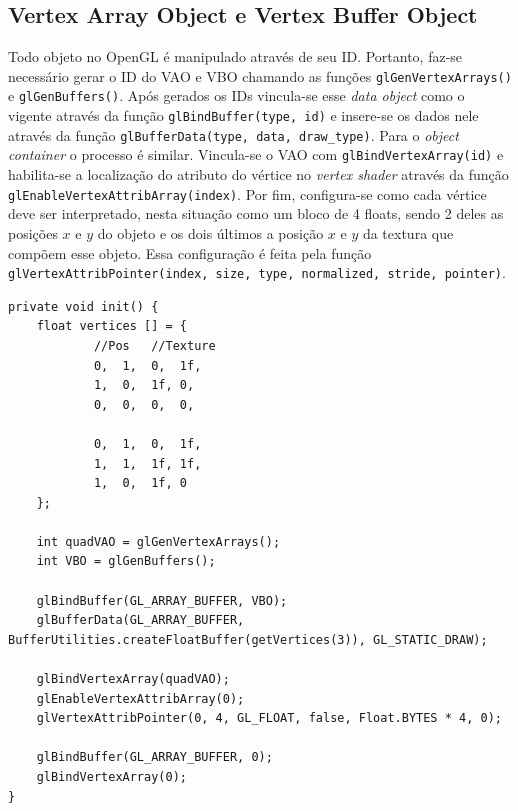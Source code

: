 \documentclass[12pt, 
openright, 
oneside, 
a4paper,    
brazil]{facom-ufu-abntex2}
\begin{document}
\subsection{Vertex Array Object e Vertex Buffer Object}
Todo objeto no OpenGL é manipulado através de seu ID. Portanto, faz-se necessário gerar o ID do VAO e VBO chamando as funções \texttt{glGenVertexArrays()} e \linebreak \texttt{glGenBuffers()}. Após gerados os IDs vincula-se esse \textit{data object} como o vigente através da função \texttt{glBindBuffer}\texttt{(type, id)} e insere-se os dados nele através da função \texttt{glBufferData(type, data, draw_type)}. Para o \textit{object container} o processo é similar. Vincula-se o VAO com \texttt{glBindVertexArray(id)} e habilita-se a localização do atributo do vértice no \textit{vertex shader} através da função \texttt{glEnableVertexAttribArray(index)}. Por fim, configura-se como cada vértice deve ser interpretado, nesta situação como um bloco de 4 floats, sendo 2 deles as posições $x$ e $y$ do objeto e os dois últimos a posição $x$ e $y$ da textura que compõem esse objeto. Essa configuração é feita pela função \texttt{glVertexAttribPointer(index, size, type, normalized, stride, pointer)}.

\begin{lstlisting}[caption=Inicialização do VBO e VAO, label={alg:initVBOVAO}]
private void init() {
	float vertices [] = {
			//Pos	//Texture
			0,	1,	0,	1f,
			1,	0,	1f,	0,
			0,	0,	0,	0,
			
			0,	1,	0,	1f,
			1,	1,	1f,	1f,
			1,	0,	1f,	0
	};
	
	int quadVAO = glGenVertexArrays();
	int VBO = glGenBuffers();
	
	glBindBuffer(GL_ARRAY_BUFFER, VBO);
	glBufferData(GL_ARRAY_BUFFER, BufferUtilities.createFloatBuffer(getVertices(3)), GL_STATIC_DRAW); 
	
	glBindVertexArray(quadVAO);
	glEnableVertexAttribArray(0);
	glVertexAttribPointer(0, 4, GL_FLOAT, false, Float.BYTES * 4, 0);
	
	glBindBuffer(GL_ARRAY_BUFFER, 0);
	glBindVertexArray(0);
}
\end{lstlisting}
\end{document}
